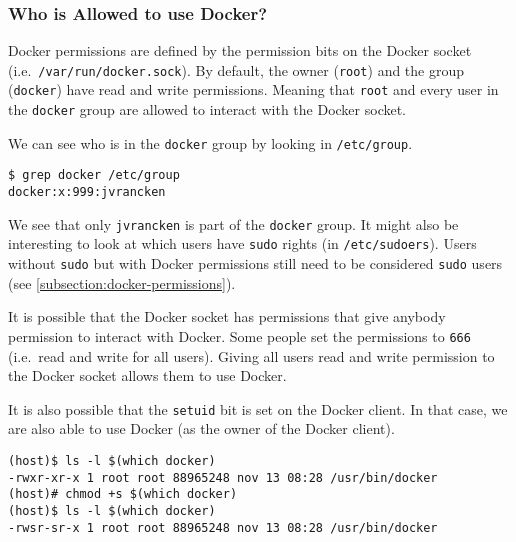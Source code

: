 \subsubsection{Who is Allowed to use Docker?}
Docker permissions are defined by the permission bits on the Docker socket (i.e.\ \lstinline{/var/run/docker.sock}). By default, the owner (\lstinline{root}) and the group (\lstinline{docker}) have read and write permissions. Meaning that \lstinline{root} and every user in the \lstinline{docker} group are allowed to interact with the Docker socket.

We can see who is in the \lstinline{docker} group by looking in \lstinline{/etc/group}.
\begin{lstlisting}[caption={See what users are in the \lstinline{docker} group.},captionpos=b]
$ grep docker /etc/group
docker:x:999:jvrancken
\end{lstlisting}
We see that only \lstinline{jvrancken} is part of the \lstinline{docker} group. It might also be interesting to look at which users have \lstinline{sudo} rights (in \lstinline{/etc/sudoers}). Users without \lstinline{sudo} but with Docker permissions still need to be considered \lstinline{sudo} users (see \autoref{subsection:docker-permissions}).

\hfill

It is possible that the Docker socket has permissions that give anybody permission to interact with Docker. Some people set the permissions to \lstinline{666} (i.e.\ read and write for all users). Giving all users read and write permission to the Docker socket allows them to use Docker.

\hfill

It is also possible that the \lstinline{setuid} bit is set on the Docker client. In that case, we are also able to use Docker (as the owner of the Docker client).

\begin{lstlisting}[caption={Permissions without and with the \lstinline{setuid} bit.},captionpos=b]
(host)$ ls -l $(which docker)
-rwxr-xr-x 1 root root 88965248 nov 13 08:28 /usr/bin/docker
(host)# chmod +s $(which docker)
(host)$ ls -l $(which docker)
-rwsr-sr-x 1 root root 88965248 nov 13 08:28 /usr/bin/docker
\end{lstlisting}
